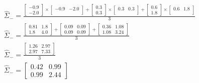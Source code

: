 \documentclass[leqno]{article}
\begin{document}
\begin{gather*}
\begin{split}
&\hat{\Sigma}_- = 
\frac{\begin{bmatrix}
   -0.9\\
   -2.0 
\end{bmatrix} \times \begin{bmatrix}
   -0.9 & -2.0\\
\end{bmatrix} + 
\begin{bmatrix}
   0.3\\
   0.3 
\end{bmatrix} \times \begin{bmatrix}
   0.3 & 0.3\\
\end{bmatrix} +
\begin{bmatrix}
   0.6\\
   1.8 
\end{bmatrix} \times \begin{bmatrix}
   0.6 & 1.8\\
\end{bmatrix}}{3}\\ 
&\hat{\Sigma}_- = 
\frac{\begin{bmatrix}
   0.81 & 1.8\\
   1.8 & 4.0 
\end{bmatrix} + 
\begin{bmatrix}
   0.09 & 0.09\\
   0.09 & 0.09 
\end{bmatrix} +
\begin{bmatrix}
   0.36 & 1.08\\
   1.08 & 3.24 
\end{bmatrix}
 }{3}\\
&\hat{\Sigma}_- = 
\frac{\begin{bmatrix}
   1.26 & 2.97\\
   2.97 & 7.33 
\end{bmatrix}}{3}\\
&\hat{\Sigma}_- = 
\begin{bmatrix}
   0.42 & 0.99\\
   0.99 & 2.44 
\end{bmatrix}\\
\end{split}
\end{gather*}

\hfill
\end{document}
